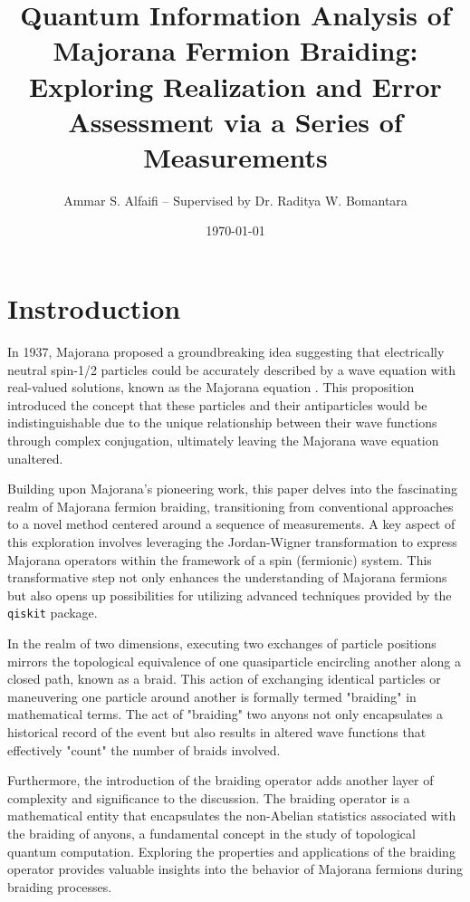 \documentclass{article}
\title{Quantum Information Analysis of Majorana Fermion Braiding: Exploring Realization and Error Assessment via a Series of Measurements}
\author{Ammar S. Alfaifi -- Supervised by Dr. Raditya W. Bomantara}
\date{\today}
\def\c#1{\texttt{#1}}
\begin{document}
\maketitle

\section{Instroduction} %
\label{sec:Instroduction}
In 1937, Majorana proposed a groundbreaking idea suggesting that electrically neutral spin-1/2 particles could be accurately described by a wave equation with real-valued solutions, known as the Majorana equation \cite{Majorana2006}. This proposition introduced the concept that these particles and their antiparticles would be indistinguishable due to the unique relationship between their wave functions through complex conjugation, ultimately leaving the Majorana wave equation unaltered.

Building upon Majorana's pioneering work, this paper delves into the fascinating realm of Majorana fermion braiding, transitioning from conventional approaches to a novel method centered around a sequence of measurements. A key aspect of this exploration involves leveraging the Jordan-Wigner transformation to express Majorana operators within the framework of a spin (fermionic) system. This transformative step not only enhances the understanding of Majorana fermions but also opens up possibilities for utilizing advanced techniques provided by the \c{qiskit} package.

In the realm of two dimensions, executing two exchanges of particle positions mirrors the topological equivalence of one quasiparticle encircling another along a closed path, known as a braid. This action of exchanging identical particles or maneuvering one particle around another is formally termed "braiding" in mathematical terms. The act of "braiding" two anyons not only encapsulates a historical record of the event but also results in altered wave functions that effectively "count" the number of braids involved.\cite{Nakamura_2020}

Furthermore, the introduction of the braiding operator adds another layer of complexity and significance to the discussion. The braiding operator is a mathematical entity that encapsulates the non-Abelian statistics associated with the braiding of anyons, a fundamental concept in the study of topological quantum computation. Exploring the properties and applications of the braiding operator provides valuable insights into the behavior of Majorana fermions during braiding processes.
\end{document}
